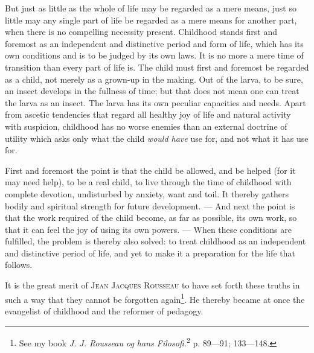 \documentclass[12pt,a4paper,openany]{book}
\begin{document}
But just as little as the whole of life may be regarded as a mere means, just so little may any single part of life be
regarded as a mere means for another part, when there is no compelling necessity present. Childhood stands first and
foremost as an independent and distinctive period and form of life, which has its own conditions and is to be judged by
its own laws. It is no more a mere time of transition than every part of life is. The child must first and foremost be
regarded as a child, not merely as a grown-up in the making. Out of the larva, to be sure, an insect develops in the
fullness of time; but that does not mean one can treat the larva as an insect. The larva has its own peculiar
capacities and needs. Apart from ascetic tendencies that regard all healthy joy of life and natural activity with
suspicion, childhood has no worse enemies than an external doctrine of utility which asks only what the child \textit{would
have} use for, and not what it has use for.

First and foremost the point is that the child be allowed, and be helped (for it may need help), to be a real child, to
live through the time of childhood with complete devotion, undisturbed by anxiety, want and toil. It thereby gathers
bodily and spiritual strength for future development. --- And next the point is that the work required of the child
become, as far as possible, its own work, so that it can feel the joy of using its own powers. --- When these conditions
are fulfilled, the problem is thereby also solved: to treat childhood as an independent and distinctive period of life,
and yet to make it a preparation for the life that follows.

It is the great merit of \textsc{Jean Jacques Rousseau} to have set forth these truths in such a way that they cannot be
forgotten again\footnote[1]{See my book \textit{J. J. Rousseau og hans Filosofi.}\textsuperscript{2} p. 89---91;
133---148.}. He thereby became at once the evangelist of childhood and the reformer of pedagogy.
\end{document}
